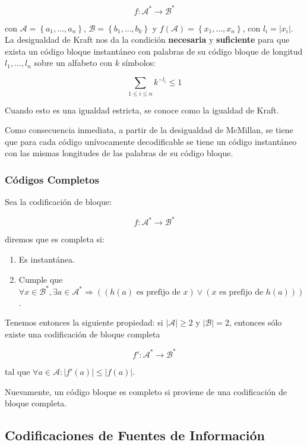\[
f:\mathcal{A}^*\rightarrow\mathcal{B}^*
\]

con \(\mathcal{A}=\left\{a_1,\dots,a_n\right\}\),
\(\mathcal{B}=\left\{b_1,\dots,b_k\right\}\) y
\(f\left(\mathcal{A}\right)=\left\{x_1,\dots,x_n\right\}\), con
\(l_i = \left|x_i\right|\). La desigualdad de Kraft nos da la condición
\textbf{necesaria} y \textbf{suficiente} para que exista un código
bloque instantáneo con palabras de su código bloque de longitud
\(l_1,\dots,l_n\) sobre un alfabeto con \(k\) símbolos:

\[
\sum_{1\leq i\leq n}k^{-l_i}\leq 1
\]

Cuando esto es una igualdad estricta, se conoce como la igualdad de
Kraft.

Como consecuencia inmediata, a partir de la desigualdad de McMillan, se
tiene que para cada código unívocamente decodificable se tiene un código
instantáneo con las mismas longitudes de las palabras de su código
bloque.

\subsubsection{Códigos Completos}\label{cuxf3digos-completos}

Sea la codificación de bloque:

\[
f:\mathcal{A}^*\rightarrow\mathcal{B}^*
\]

diremos que es completa si:

\begin{enumerate}
\def\labelenumi{\arabic{enumi}.}
\tightlist
\item
  Es instantánea.
\item
  Cumple que
  \(\forall x\in\mathcal{B}^*,\exists a\in\mathcal{A}^*\Rightarrow\left(\left(h(a)\text{ es prefijo de }x\right)\vee\left(x\text{ es prefijo de }h(a)\right)\right)\).
\end{enumerate}

Tenemos entonces la siguiente propiedad: si
\(\left|\mathcal{A}\right|\geq 2\) y \(\left|\mathcal{B}\right|=2\),
entonces sólo existe una codificación de bloque completa

\[
f':\mathcal{A}^*\rightarrow\mathcal{B}^*
\]

tal que
\(\forall a\in\mathcal{A}:\left|f'(a)\right|\leq\left|f(a)\right|\).

Nuevamente, un código bloque es completo si proviene de una codificación
de bloque completa.

\subsection{Codificaciones de Fuentes de
Información}\label{codificaciones-de-fuentes-de-informaciuxf3n}

